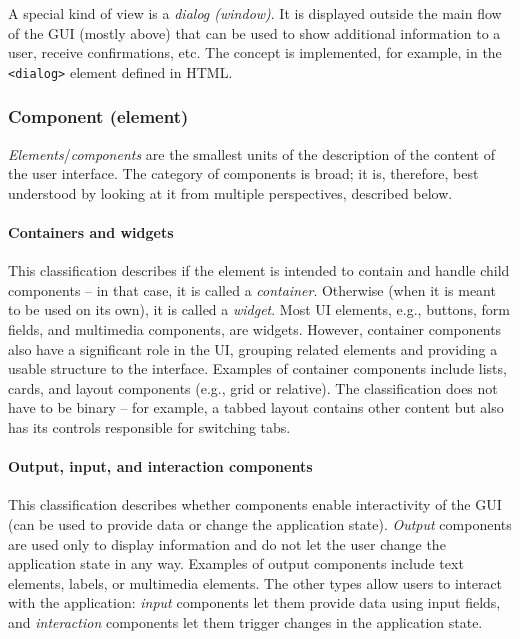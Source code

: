 A special kind of view is a \emph{dialog (window)}.
It is displayed outside the main flow of the GUI (mostly above) that can be used to show additional information to a user, receive confirmations, etc.
The concept is implemented, for example, in the \texttt{<dialog>} element defined in HTML.

\subsubsection{Component (element)}
\emph{Elements}/\emph{components} are the smallest units of the description of the content of the user interface.
The category of components is broad;
it is, therefore, best understood by looking at it from multiple perspectives, described below.

\paragraph{Containers and widgets}
This classification describes if the element is intended to contain and handle child components -- in that case, it is called a \emph{container}.
Otherwise (when it is meant to be used on its own), it is called a \emph{widget}.
Most UI elements, e.g., buttons, form fields, and multimedia components, are widgets.
However, container components also have a significant role in the UI, grouping related elements and providing a usable structure to the interface.
Examples of container components include lists, cards, and layout components (e.g., grid or relative).
The classification does not have to be binary -- for example, a tabbed layout contains other content but also has its controls responsible for switching tabs.

\paragraph{Output, input, and interaction components}
This classification describes whether components enable interactivity of the GUI (can be used to provide data or change the application state).
\emph{Output} components are used only to display information and do not let the user change the application state in any way.
Examples of output components include text elements, labels, or multimedia elements.
The other types allow users to interact with the application: \emph{input} components let them provide data using input fields, and \emph{interaction} components let them trigger changes in the application state.

